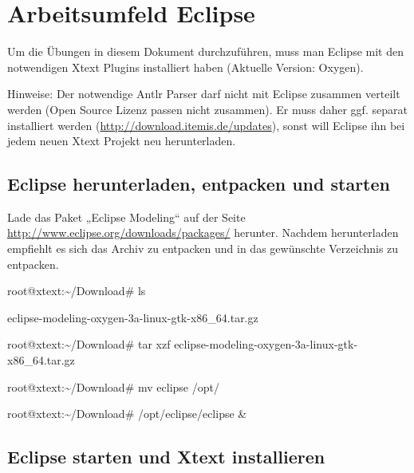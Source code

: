 \documentclass[a4]{article}
\begin{document}
\section[Arbeitsumfeld
Eclipse]{\texorpdfstring{\protect\hypertarget{anchor-14}{}{}Arbeitsumfeld
Eclipse}{Arbeitsumfeld Eclipse}}\label{arbeitsumfeld-eclipse}

Um die Übungen in diesem Dokument durchzuführen, muss man Eclipse mit
den notwendigen Xtext Plugins installiert haben (Aktuelle Version:
Oxygen).

Hinweise: Der notwendige Antlr Parser darf nicht mit
Eclipse zusammen verteilt werden (Open Source Lizenz passen nicht
zusammen). Er muss daher ggf. separat installiert werden
(\url{http://download.itemis.de/updates}), sonst will Eclipse ihn bei
jedem neuen Xtext Projekt neu herunterladen.

\subsection[Eclipse herunterladen, entpacken und
starten]{\texorpdfstring{\protect\hypertarget{anchor-15}{}{}Eclipse
herunterladen, entpacken und
starten}{Eclipse herunterladen, entpacken und starten}}\label{eclipse-herunterladen-entpacken-und-starten}

Lade das Paket „Eclipse Modeling`` auf der Seite
\url{http://www.eclipse.org/downloads/packages/} herunter. Nachdem
herunterladen empfiehlt es sich das Archiv zu entpacken und in das
gewünschte Verzeichnis zu entpacken.

root@xtext:\textasciitilde{}/Download\# ls

eclipse-modeling-oxygen-3a-linux-gtk-x86\_64.tar.gz

root@xtext:\textasciitilde{}/Download\# tar xzf
eclipse-modeling-oxygen-3a-linux-gtk-x86\_64.tar.gz

root@xtext:\textasciitilde{}/Download\# mv eclipse /opt/

root@xtext:\textasciitilde{}/Download\# /opt/eclipse/eclipse \&

\subsection[Eclipse starten und Xtext
installieren]{\texorpdfstring{\protect\hypertarget{anchor-16}{}{}Eclipse
starten und Xtext
installieren}{Eclipse starten und Xtext installieren}}\label{eclipse-starten-und-xtext-installieren}
\end{document}
